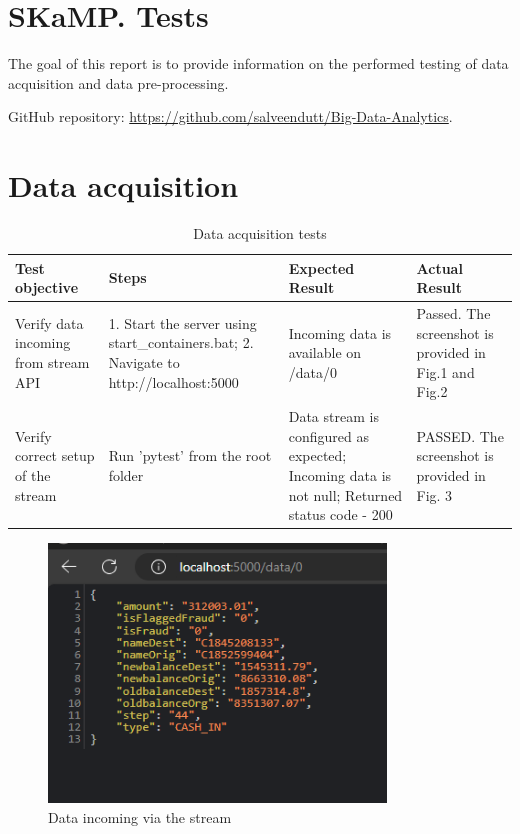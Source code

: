 \documentclass[12pt,a4paper, hidelinks]{article}
\begin{document}
\section*{SKaMP. Tests}
\vspace{\baselineskip} %

The goal of this report is to provide information on the performed testing of data acquisition and data pre-processing.

GitHub repository: \href{https://github.com/salveendutt/Big-Data-Analytics}{https://github.com/salveendutt/Big-Data-Analytics}.

\section{Data acquisition}

\begin{table}[htbp]
\centering
\begin{tabular}{|p{3cm}|p{3cm}|p{3cm}|p{5cm}|}
\hline
\textbf{Test objective} & \textbf{Steps} & \textbf{Expected Result} & \textbf{Actual Result} \\
\hline
Verify data incoming from stream API & 1. Start the server using start\_containers.bat; 2. Navigate to http://localhost:5000 & Incoming data is available on /data/0 & Passed. The screenshot is provided in Fig.1 and Fig.2 \\
\hline
Verify correct setup of the stream & Run 'pytest' from the root folder & Data stream is configured as expected; Incoming data is not null; Returned status code - 200 & PASSED. The screenshot is provided in Fig. 3 \\
\hline
\end{tabular}
\caption{Data acquisition tests}
\end{table}

\begin{figure}[htbp]
  \centering
  \includegraphics[width=0.8\textwidth]{images/test-stream-M2.png}
  \caption{Data incoming via the stream}
  \label{fig:streaming-api}
\end{figure}
\end{document}
